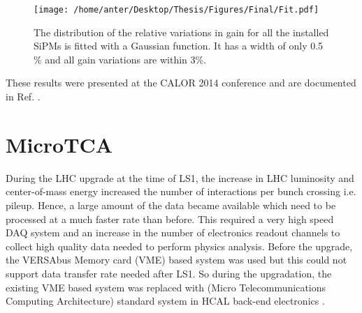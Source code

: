 \begin{figure}[!h]
\begin{center}
\texttt{[image: /home/anter/Desktop/Thesis/Figures/Final/Fit.pdf]}
\vspace*{4mm}
\caption{The distribution of the relative variations in gain for all the installed SiPMs is fitted with a Gaussian function. It has a width of only 0.5 \% and all gain variations are within 3\%.}
\label{fig:gain2}
\end{center}
\end{figure}
These results were presented at the CALOR 2014 conference \cite{Kunsken:2015zla} and are documented in Ref. \cite{DN}.

\section{MicroTCA}
During the LHC upgrade at the time of LS1, the increase in LHC luminosity and center-of-mass energy increased the number of interactions per bunch crossing i.e. pileup. Hence, a large amount of the data became available which need to be processed at a much faster rate than before. This required a very high speed DAQ system and an increase in the number of electronics readout channels to collect high quality data needed to perform physics analysis. Before the upgrade, the VERSAbus Memory card (VME) based system was used but this could not support data transfer rate needed after LS1. So during the upgradation, the existing VME based system was replaced with \mtca (Micro Telecommunications Computing Architecture) standard system in HCAL back-end electronics \cite{CMS:2012tda}. 

